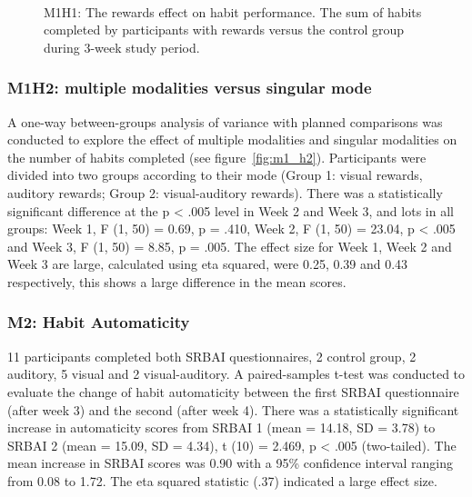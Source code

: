 \begin{figure}[H]
  \caption{M1H1: The rewards effect on habit performance. The sum of habits completed by participants with rewards versus the control group during 3-week study period.}~\label{fig:m1_h1}
\end{figure}



\subsubsection*{M1H2: multiple modalities versus singular mode}
A one-way between-groups analysis of variance with planned comparisons was conducted to explore the effect of multiple modalities and singular modalities on the number of habits completed (see figure~\ref{fig:m1_h2}). Participants were divided into two groups according to their mode (Group 1: visual rewards, auditory rewards; Group 2: visual-auditory rewards). There was a statistically significant difference at the p < .005 level in Week 2 and Week 3, and lots in all groups: Week 1, F (1, 50) = 0.69, p = .410, Week 2, F (1, 50) = 23.04, p < .005 and Week 3, F (1, 50) = 8.85, p = .005. The effect size for Week 1, Week 2 and Week 3 are large, calculated using eta squared, were 0.25, 0.39 and 0.43 respectively, this shows a large difference in the mean scores.







\subsubsection{M2: Habit Automaticity}
11 participants completed both SRBAI questionnaires, 2 control group, 2 auditory, 5 visual and 2 visual-auditory. A paired-samples t-test was conducted to evaluate the change of habit automaticity between the first SRBAI questionnaire (after week 3) and the second (after week 4). There was a statistically significant increase in automaticity scores from SRBAI 1 (mean = 14.18, SD = 3.78) to SRBAI 2 (mean = 15.09, SD = 4.34), t (10) = 2.469, p < .005 (two-tailed). The mean increase in SRBAI scores was 0.90 with a 95\% confidence interval ranging from 0.08 to 1.72. The eta squared statistic (.37) indicated a large effect size.


